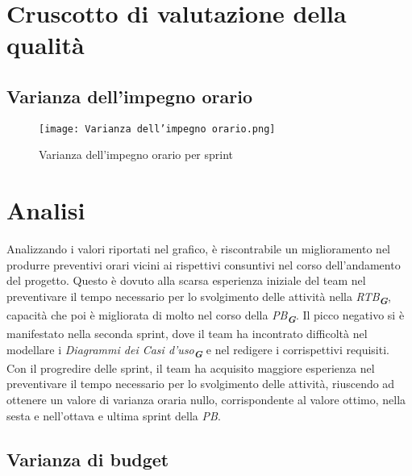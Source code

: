 

\section{Cruscotto di valutazione della qualità}
\label{sec:Cruscotto di valutazione della qualità}

\vspace{0.5cm}

\subsection{Varianza dell'impegno orario}
\label{subsec:Varianza dell'impegno orario}

\begin{figure}[h] 
    \centering
    \texttt{[image: Varianza dell'impegno orario.png]}
    \caption{Varianza dell'impegno orario per sprint}
    \label{fig: Varianza dell'impegno orario}
\end{figure}

\section*{Analisi}

Analizzando i valori riportati nel grafico, è riscontrabile un miglioramento nel produrre
preventivi orari vicini ai rispettivi consuntivi nel corso dell'andamento del progetto. Questo è dovuto alla scarsa esperienza iniziale del team
nel preventivare il tempo necessario per lo svolgimento delle attività nella \emph{RTB}\textsubscript{\textbf{\textit{G}}}, capacità che poi è migliorata di molto nel corso della \emph{PB}\textsubscript{\textbf{\textit{G}}}. Il picco negativo si è manifestato nella seconda sprint, dove il team ha incontrato difficoltà
nel modellare i \emph{Diagrammi dei Casi d'uso}\textsubscript{\textbf{\textit{G}}} e nel redigere i corrispettivi requisiti.
Con il progredire delle sprint, il team ha acquisito maggiore esperienza nel preventivare
il tempo necessario per lo svolgimento delle attività, riuscendo ad ottenere un valore di varianza oraria nullo, corrispondente al valore ottimo, nella sesta e nell'ottava e ultima sprint della \emph{PB}.

\newpage

\subsection{Varianza di budget}
\label{subsec:Varianza di budget}

